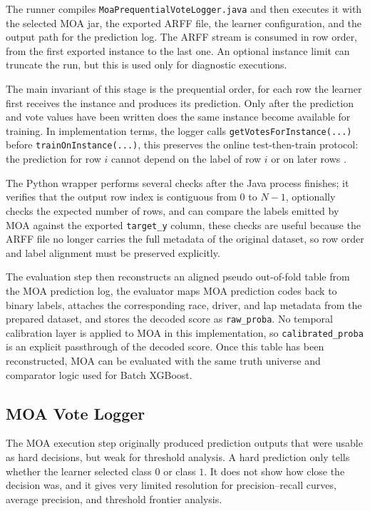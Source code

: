 The runner compiles \texttt{MoaPrequentialVoteLogger.java} and then executes it with the selected MOA jar, the exported ARFF file, the learner configuration, and the output
path for the prediction log. The ARFF stream is consumed in row order, from the first exported instance to the last one. An optional instance limit can truncate the run,
but this is used only for diagnostic executions.

The main invariant of this stage is the prequential order, for each row the learner first receives the instance and produces its prediction. Only after the prediction and
vote values have been written does the same instance become available for training. In implementation terms, the logger calls \texttt{getVotesForInstance(...)} before
\texttt{trainOnInstance(...)}, this preserves the online test-then-train protocol: the prediction for row $i$ cannot depend on the label of row $i$ or on later rows \cite{bifet2010moa}.

The Python wrapper performs several checks after the Java process finishes; it verifies that the output row index is contiguous from $0$ to $N-1$, optionally checks the expected
number of rows, and can compare the labels emitted by MOA against the exported \texttt{target\_y} column, these checks are useful because the ARFF file no longer carries the full
metadata of the original dataset, so row order and label alignment must be preserved explicitly.

The evaluation step then reconstructs an aligned pseudo out-of-fold table from the MOA prediction log, the evaluator maps MOA prediction codes back to binary labels, attaches
the corresponding race, driver, and lap metadata from the prepared dataset, and stores the decoded score as \texttt{raw\_proba}. No temporal calibration layer is applied to MOA
in this implementation, so \texttt{calibrated\_proba} is an explicit passthrough of the decoded score. Once this table has been reconstructed, MOA can be evaluated with the same
truth universe and comparator logic used for Batch XGBoost.

\subsection{MOA Vote Logger}

The MOA execution step originally produced prediction outputs that were usable as hard decisions, but weak for threshold analysis. A hard prediction only tells whether
the learner selected class $0$ or class $1$. It does not show how close the decision was, and it gives very limited resolution for precision--recall curves, average precision,
and threshold frontier analysis.

